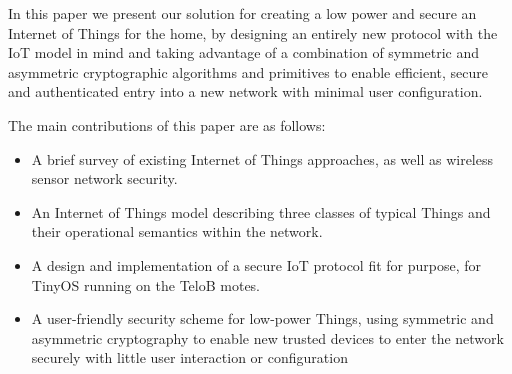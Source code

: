 \documentclass[conference]{./sty/IEEEtran}
\begin{document}
In this paper we present our solution for creating a low power and secure an Internet of Things for the home, by designing an entirely new protocol with the IoT model in mind and taking advantage of a combination of symmetric and asymmetric cryptographic algorithms and primitives to enable efficient, secure and authenticated entry into a new network with minimal user configuration.


The main contributions of this paper are as follows:
\begin{itemize}
  \item A brief survey of existing Internet of Things approaches, as well as wireless sensor network security.
  \item An Internet of Things model describing three classes of typical Things and their operational semantics within the network.
  \item A design and implementation of a secure IoT protocol fit for purpose, for TinyOS running on the TeloB motes.
  \item A user-friendly security scheme for low-power Things, using symmetric and asymmetric cryptography to enable new trusted devices to enter the network securely with little user interaction or configuration  
\end{itemize}



\end{document}
